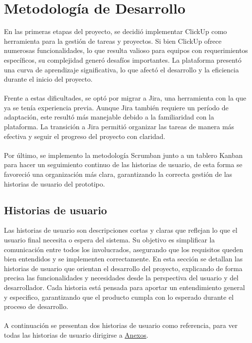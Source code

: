 \section{Metodología de Desarrollo}

En las primeras etapas del proyecto, se decidió implementar ClickUp como herramienta para la gestión de tareas y proyectos. Si bien ClickUp ofrece numerosas funcionalidades, lo que resulta valioso para equipos con requerimientos específicos, su complejidad generó desafíos importantes. La plataforma presentó una curva de aprendizaje significativa, lo que afectó el desarrollo y la eficiencia durante el inicio del proyecto.
\\
\\
Frente a estas dificultades, se optó por migrar a Jira, una herramienta con la que ya se tenía experiencia previa. Aunque Jira también requiere un período de adaptación, este resultó más manejable debido a la familiaridad con la plataforma. La transición a Jira permitió organizar las tareas de manera más efectiva y seguir el progreso del proyecto con claridad.
\\
\\
Por último, se implemento la metodología Scrumban junto a un tablero Kanban para hacer un seguimiento continuo de las historias de usuario, de esta forma se favoreció una organización más clara, garantizando la correcta gestión de las historias de usuario del prototipo.

\subsection{Historias de usuario}

Las historias de usuario son descripciones cortas y claras que reflejan lo que el usuario final necesita o espera del sistema. Su objetivo es simplificar la comunicación entre todos los involucrados, asegurando que los requisitos queden bien entendidos y se implementen correctamente. En esta sección se detallan las historias de usuario que orientan el desarrollo del proyecto, explicando de forma precisa las funcionalidades y necesidades desde la perspectiva del usuario y del desarrollador. Cada historia está pensada para aportar un entendimiento general y especifico, garantizando que el producto cumpla con lo esperado durante el proceso de desarrollo.
\\
\\
A continuación se presentan dos historias de usuario como referencia, para ver todas las historias de usuario dirigirse a \hyperref[Anexos]{Anexos}.


